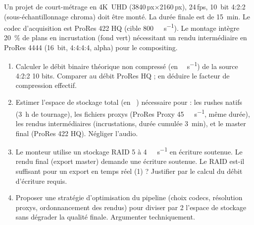 \documentclass[11pt]{article}
\begin{document}
\begin{exercice}
Un projet de court-métrage en \SI{4K}{UHD} (\num{3840}\,px$\times$\num{2160}\,px), \num{24}\,fps, \SI{10}{bit} 4:2:2 (sous-échantillonnage chroma) doit être monté. La durée finale est de \SI{15}{\minute}. Le codec d'acquisition est ProRes 422 HQ (cible \SI{800}{\mebi\bit\per\second}). Le montage intègre \SI{20}{\%} de plans en incrustation (fond vert) nécessitant un rendu intermédiaire en ProRes 4444 (\SI{16}{bit}, 4:4:4:4, alpha) pour le compositing.
\begin{enumerate}
    \item Calculer le débit binaire théorique non compressé (en \unit{\gibi\bit\per\second}) de la source 4:2:2 10 bits. Comparer au débit ProRes HQ ; en déduire le facteur de compression effectif.
    \item Estimer l'espace de stockage total (en \unit{\gibi\byte}) nécessaire pour : les rushes natifs (\qty{3}{\hour} de tournage), les fichiers proxys (ProRes Proxy \qty{45}{\mebi\bit\per\second}, même durée), les rendus intermédiaires (incrustations, durée cumulée \qty{3}{\minute}), et le master final (ProRes 422 HQ). Négliger l'audio.
    \item Le monteur utilise un stockage RAID 5 à \qty{4}{\gibi\byte\per\second} en écriture soutenue. Le rendu final (export master) demande une écriture soutenue. Le RAID est-il suffisant pour un export en temps réel (\num{1}\times) ? Justifier par le calcul du débit d'écriture requis.
    \item Proposer une stratégie d'optimisation du pipeline (choix codecs, résolution proxys, ordonnancement des rendus) pour diviser par 2 l'espace de stockage sans dégrader la qualité finale. Argumenter techniquement.
\end{enumerate}
\end{exercice}
\end{document}
